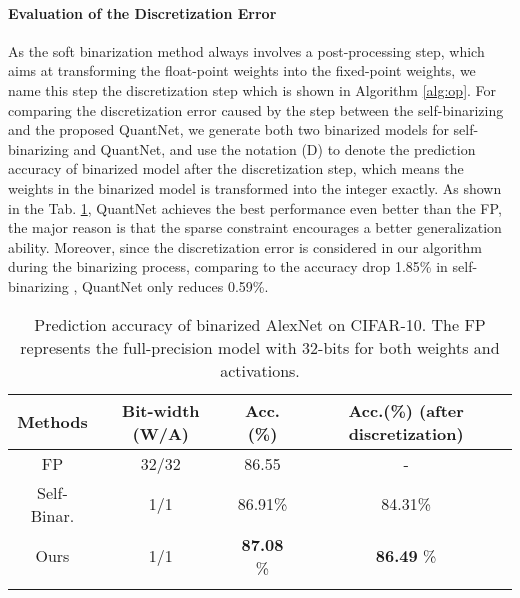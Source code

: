 \documentclass[runningheads]{llncs}
\begin{document}
\paragraph{\textbf{Evaluation of the Discretization Error}}
As the soft binarization method \cite{lahoud2019self} always involves a post-processing step,
which aims at transforming the float-point weights into the fixed-point weights,
we name this step the discretization step which is shown in Algorithm \ref{alg:op}.
For comparing the discretization error caused by the step
between the self-binarizing \cite{lahoud2019self} and the proposed QuantNet,
we generate both two binarized models for self-binarizing and QuantNet,
and use the notation (D) to denote the prediction accuracy of binarized model after the discretization step,
which means the weights in the binarized model is transformed into the integer exactly.
As shown in the Tab. \ref{tab:perf_drop}, QuantNet achieves the best performance even better than the FP,
the major reason is that the sparse constraint encourages a better generalization ability.
Moreover, since the discretization error is considered in our algorithm during the binarizing process,
comparing to the accuracy drop 1.85\% in self-binarizing \cite{lahoud2019self},
QuantNet only reduces 0.59\%.

\begin{table}[htb]
\begin{center}
   \centering
   \begin{tabular}{cccc}
   \hline
    Methods                       & Bit-width (W/A)   & Acc.(\%)             & Acc.(\%) (after discretization) \\
   \hline
    FP                                    & 32/32     &  86.55               & - \\
    Self-Binar. \cite{lahoud2019self}     & 1/1       &  86.91\%             & 84.31\%  \\
    Ours                                  & 1/1       &  \textbf{87.08} \%   & \textbf{86.49} \%    \\
    \hline
    \noalign{\smallskip}
    \noalign{\smallskip}
    \end{tabular}
    \caption{Prediction accuracy of binarized AlexNet on CIFAR-10. The FP represents the full-precision model with 32-bits for both weights and activations.}
    \label{tab:perf_drop}
\end{center}
\end{table}
\end{document}
